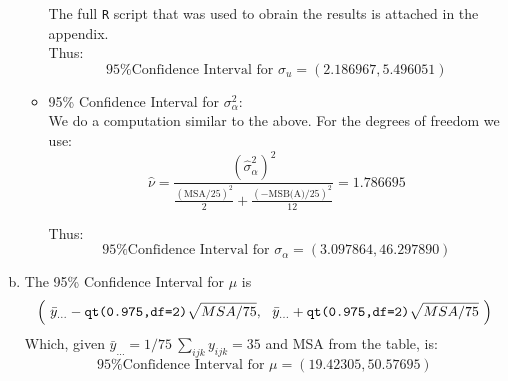 \documentclass[paper=a4, fontsize=11pt]{scrartcl} %
\begin{document}
\begin{enumerate}[(a)]
\begin{itemize}
The full \texttt{R} script that was used to obrain the results is attached in the appendix.\\

Thus:
$$
 \boxed{\text{95\% Confidence Interval for } \sigma_u = ( 2.186967, 5.496051)}
$$
\bigskip
\item 95\% Confidence Interval for $\sigma^2_\alpha:$\\
We do a computation similar to the above. For the degrees of freedom we use:
$$
\hat \nu = \frac{ (\hat \sigma^2_\alpha)^2 }{  \frac{(\text{MSA}/25)^2}{2} + \frac{(-\text{MSB(A)} / 25)^2}{12} } = 1.786695
$$

Thus:
$$
 \boxed{\text{95\% Confidence Interval for } \sigma_\alpha = (3.097864, 46.297890)}
$$
\end{itemize}
\bigskip


\item The 95\% Confidence Interval for $\mu$ is
$$
\left( \ \bar y_{...} - \text{\texttt{qt(0.975,df=2)}} \sqrt{MSA / 75}, \ \  \bar y_{...} + \text{\texttt{qt(0.975,df=2)}} \sqrt{MSA / 75} \ \right)
$$
Which, given $\bar y_{...} = 1/75 \  \sum_{ijk} y_{ijk} = 35$ and MSA from the table, is:
$$
 \boxed{\text{95\% Confidence Interval for } \mu = (19.42305, 50.57695)}
$$
\end{enumerate}
\pagebreak
\end{document}
